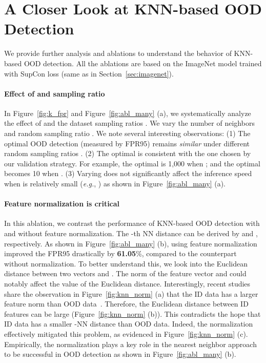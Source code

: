 \documentclass[nohyperref]{article}
\theoremstyle{plain}
\theoremstyle{definition}
\theoremstyle{remark}
\begin{document}
\section{A Closer Look at KNN-based OOD Detection}
We provide further analysis and ablations to understand the behavior of KNN-based OOD detection. All the ablations are based on the ImageNet model trained with SupCon loss (same as in Section~\ref{sec:imagenet}).

\label{sec:discussion}

\paragraph{Effect of  and sampling ratio}
In Figure~\ref{fig:k_fpr} and Figure~\ref{fig:abl_many} (a), we systematically analyze the effect of  and the dataset sampling ratios . We vary the number of neighbors  and random sampling ratio . We note several interesting observations: (1) The optimal OOD detection (measured by FPR95) remains \emph{similar} under different random sampling ratios . (2) The optimal  is consistent with the one chosen by our validation strategy. For example, the optimal  is 1,000 when ; and the optimal  becomes 10 when . (3) Varying  does not significantly affect the inference speed when  is relatively small (\emph{e.g.}, ) as shown in Figure~\ref{fig:abl_many} (a). 



\paragraph{Feature normalization is critical}
In this ablation, we contrast the performance of KNN-based OOD detection with and without feature normalization. The -th NN distance can be derived by   and , respectively. 
As shown in Figure~\ref{fig:abl_many} (b), using feature normalization improved the FPR95 drastically by \textbf{61.05}\%, compared to the counterpart without normalization. To better understand this, we look into  the Euclidean distance  between two vectors  and . The norm of the feature vector  and  could notably affect the value of the Euclidean distance. Interestingly, recent studies share the observation in Figure~\ref{fig:knn_norm} (a) that the ID data has a larger  feature norm than OOD data~\citep{tack2020csi, huang2021importance}. Therefore, the Euclidean distance between ID features can be large (Figure~\ref{fig:knn_norm} (b)).  This contradicts the hope that ID data has a smaller -NN distance than OOD data. 
Indeed, the normalization effectively mitigated this problem, as evidenced in Figure~\ref{fig:knn_norm} (c). Empirically, the normalization plays a key role in the nearest neighbor approach to be successful in OOD detection as shown in Figure~\ref{fig:abl_many} (b).
\end{document}
